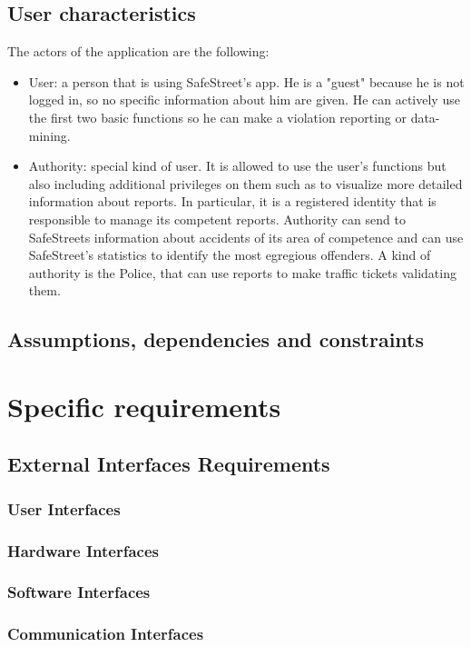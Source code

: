 \documentclass{article}
\begin{document}
	\subsection{User characteristics}
	The actors of the application are the following:
	\begin{itemize}
		\item User: a person that is using SafeStreet's app. He is a "guest" because he is not logged in, so no specific information about him are given. He can actively use the first two basic functions so he can make a violation reporting or data-mining.
		\item Authority: special kind of user. It is allowed to use the user's functions but also including additional privileges on them such as to visualize more detailed information about reports. In particular, it is a registered identity that is responsible to manage its competent reports. Authority can send to SafeStreets information about accidents of its area of competence and can use SafeStreet's statistics to identify the most egregious offenders.
		A kind of authority is the Police, that can use reports to make traffic tickets validating them.
	\end{itemize}
	
	\subsection{Assumptions, dependencies and constraints}
	
	
	\section{Specific requirements}
	\subsection{External Interfaces Requirements}
	\subsubsection{User Interfaces}
	\subsubsection{Hardware Interfaces}
	\subsubsection{Software Interfaces}
	\subsubsection{Communication Interfaces}
\end{document}
